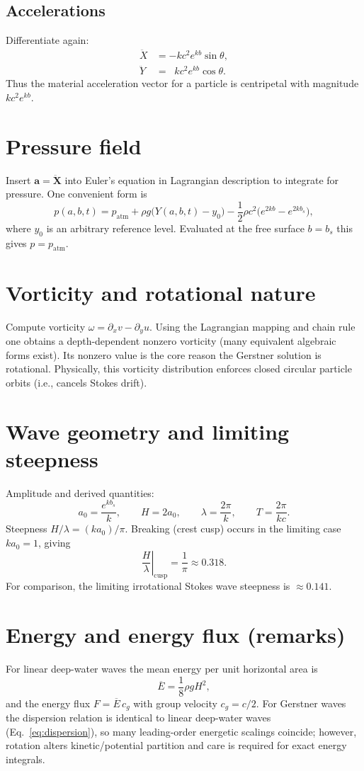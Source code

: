\documentclass[11pt,letterpaper]{article}
\begin{document}
\subsection{Accelerations}
Differentiate again:
\begin{align}
\ddot X &= -k c^2 e^{k b}\sin\theta, \\
\ddot Y &= \;\;k c^2 e^{k b}\cos\theta.
\end{align}
Thus the material acceleration vector for a particle is centripetal with magnitude $k c^2 e^{k b}$.

\section{Pressure field}
Insert $\mathbf{a}=\ddot{\mathbf{X}}$ into Euler's equation in Lagrangian description to integrate for pressure. One convenient form is
\begin{equation}\label{eq:pressure}
p(a,b,t) = p_{\mathrm{atm}} + \rho g\big(Y(a,b,t)-y_0\big) - \frac{1}{2}\rho c^2\big(e^{2k b}-e^{2k b_s}\big),
\end{equation}
where $y_0$ is an arbitrary reference level. Evaluated at the free surface $b=b_s$ this gives $p=p_{\mathrm{atm}}$.

\section{Vorticity and rotational nature}
Compute vorticity $\omega=\partial_x v - \partial_y u$. Using the Lagrangian mapping and chain rule one obtains a depth-dependent nonzero vorticity (many equivalent algebraic forms exist). Its nonzero value is the core reason the Gerstner solution is rotational. Physically, this vorticity distribution enforces closed circular particle orbits (i.e., cancels Stokes drift).

\section{Wave geometry and limiting steepness}
Amplitude and derived quantities:
\[
a_0=\frac{e^{kb_s}}{k},\qquad H=2a_0,\qquad \lambda=\frac{2\pi}{k},\qquad T=\frac{2\pi}{kc}.
\]
Steepness $H/\lambda = (k a_0)/\pi$. Breaking (crest cusp) occurs in the limiting case $k a_0=1$, giving
\[
\left.\frac{H}{\lambda}\right|_{\text{cusp}} = \frac{1}{\pi}\approx 0.318.
\]
For comparison, the limiting irrotational Stokes wave steepness is $\approx 0.141$.

\section{Energy and energy flux (remarks)}
For linear deep-water waves the mean energy per unit horizontal area is
\[
\overline{E} = \frac{1}{8}\rho g H^2,
\]
and the energy flux $F=\overline{E}\,c_g$ with group velocity $c_g=c/2$. For Gerstner waves the dispersion relation is identical to linear deep-water waves (Eq.~\ref{eq:dispersion}), so many leading-order energetic scalings coincide; however, rotation alters kinetic/potential partition and care is required for exact energy integrals.
\end{document}
